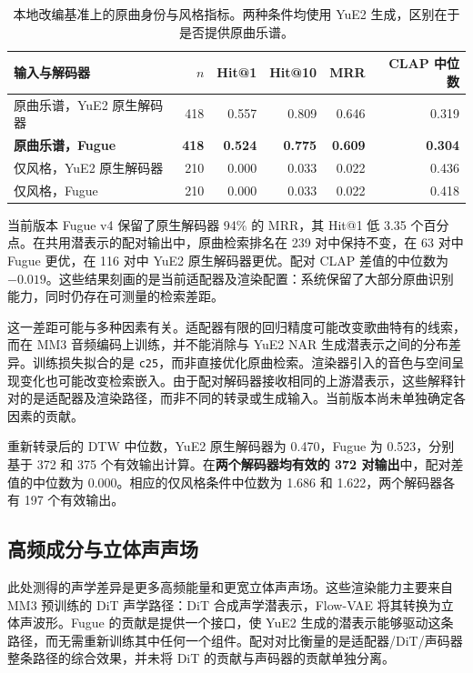 \documentclass[11pt,a4paper,fontset=fandol]{ctexart}
\newcommand{\code}[1]{\texttt{#1}}
\begin{document}
\begin{table}[htbp]
    \centering
    \caption{本地改编基准上的原曲身份与风格指标。两种条件均使用 YuE2 生成，区别在于是否提供原曲乐谱。}
    \label{tab:identity}
    \small
    \begin{tabular}{lrrrrr}
        \toprule
        输入与解码器 & $n$ & Hit@1 & Hit@10 & MRR & CLAP 中位数 \\
        \midrule
        原曲乐谱，YuE2 原生解码器 & 418 & 0.557 & 0.809 & 0.646 & 0.319 \\
        \textbf{原曲乐谱，Fugue} & \textbf{418} & \textbf{0.524} & \textbf{0.775} & \textbf{0.609} & \textbf{0.304} \\
        仅风格，YuE2 原生解码器 & 210 & 0.000 & 0.033 & 0.022 & 0.436 \\
        仅风格，Fugue & 210 & 0.000 & 0.033 & 0.022 & 0.418 \\
        \bottomrule
    \end{tabular}
\end{table}

当前版本 Fugue v4 保留了原生解码器 94\% 的 MRR，其 Hit@1 低 3.35 个百分点。在共用潜表示的配对输出中，原曲检索排名在 239 对中保持不变，在 63 对中 Fugue 更优，在 116 对中 YuE2 原生解码器更优。配对 CLAP 差值的中位数为 $-0.019$。这些结果刻画的是当前适配器及渲染配置：系统保留了大部分原曲识别能力，同时仍存在可测量的检索差距。

这一差距可能与多种因素有关。适配器有限的回归精度可能改变歌曲特有的线索，而在 MM3 音频编码上训练，并不能消除与 YuE2 NAR 生成潜表示之间的分布差异。训练损失拟合的是 \code{c25}，而非直接优化原曲检索。渲染器引入的音色与空间呈现变化也可能改变检索嵌入。由于配对解码器接收相同的上游潜表示，这些解释针对的是适配器及渲染路径，而非不同的转录或生成输入。当前版本尚未单独确定各因素的贡献。

重新转录后的 DTW 中位数，YuE2 原生解码器为 0.470，Fugue 为 0.523，分别基于 372 和 375 个有效输出计算。在\textbf{两个解码器均有效的 372 对输出}中，配对差值的中位数为 0.000。相应的仅风格条件中位数为 1.686 和 1.622，两个解码器各有 197 个有效输出。

\subsection{高频成分与立体声声场}
\label{sec:acoustic}

此处测得的声学差异是更多高频能量和更宽立体声声场。这些渲染能力主要来自 MM3 预训练的 DiT 声学路径：DiT 合成声学潜表示，Flow-VAE 将其转换为立体声波形。Fugue 的贡献是提供一个接口，使 YuE2 生成的潜表示能够驱动这条路径，而无需重新训练其中任何一个组件。配对对比衡量的是适配器/DiT/声码器整条路径的综合效果，并未将 DiT 的贡献与声码器的贡献单独分离。
\end{document}
